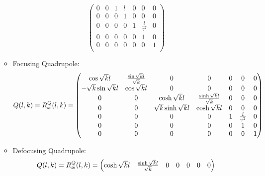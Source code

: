 \begin{itemize}
\begin{itemize}
\begin{equation*}
\begin{pmatrix}
                                             0 & 0 & 1 & l & 0 & 0 & 0 \\ %
                                             0 & 0 & 0 & 1 & 0 & 0 & 0 \\ %
                                             0 & 0 & 0 & 0 & 1 & \frac{l}{\gamma^2} & 0 \\ %
                                             0 & 0 & 0 & 0 & 0 & 1 & 0 \\ %
                                             0 & 0 & 0 & 0 & 0 & 0 & 1 \\
                                         \end{pmatrix}
            \end{equation*}
        \item Focusing Quadrupole:
            \begin{equation*}
                Q(l,k) = R_{\actuators}^Q (l,k) = \begin{pmatrix}
                                                  \cos{\sqrt{k} l} & \frac{\sin{\sqrt{k} l}}{\sqrt{k}} & 0 & 0 & 0 & 0 & 0 \\ %
                                                  -\sqrt{k}\sin{\sqrt{k} l} & \cos{\sqrt{k} l} & 0 & 0 & 0 & 0 & 0 \\ %
                                                  0 & 0 & \cosh{\sqrt{k} l} & \frac{\sinh{\sqrt{k} l}}{\sqrt{k}} & 0 & 0 & 0 \\ %
                                                  0 & 0 & \sqrt{k}\sinh{\sqrt{k} l} & \cosh{\sqrt{k} l} & 0 & 0 & 0 \\ %
                                                  0 & 0 & 0 & 0 & 1 & \frac{l}{\gamma^2} & 0 \\ %
                                                  0 & 0 & 0 & 0 & 0 & 1 & 0 \\ %
                                                  0 & 0 & 0 & 0 & 0 & 0 & 1 \\
                                              \end{pmatrix}
            \end{equation*}
        \item Defocusing Quadrupole:
            \begin{equation*}
                Q(l,k) = R_{\actuators}^Q (l,k) = \begin{pmatrix}
                                                  \cosh{\sqrt{k} l} & \frac{\sinh{\sqrt{k} l}}{\sqrt{k}} & 0 & 0 & 0 & 0 & 0 \\ %

\end{pmatrix}
\end{equation*}
\end{itemize}
\end{itemize}
